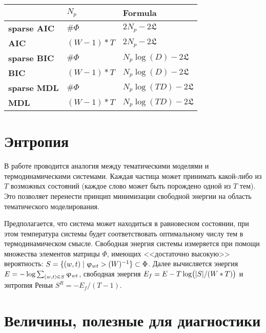\begin{table}[h]
    \centering
    \begin{tabular}{lll}
    \toprule
               & $N_p$       & Formula                                             \\
    \midrule
    \textbf{sparse AIC} & $\#\Phi$       & $2 N_p - 2 \mathfrak{L}$                \\
    \textbf{AIC}        & $(W - 1) * T$  & $2 N_p - 2 \mathfrak{L}$                \\
    \textbf{sparse BIC} & $\#\Phi$       & $N_p \log(D) - 2 \mathfrak{L}$          \\
    \textbf{BIC}        & $(W - 1) * T$  & $N_p \log(D) - 2 \mathfrak{L}$          \\
    \textbf{sparse MDL} & $\#\Phi$       & $N_p \log(TD) - 2 \mathfrak{L}$         \\
    \textbf{MDL}        & $(W - 1) * T$  & $N_p \log(TD) - 2 \mathfrak{L}$\\
    \bottomrule
    \end{tabular}
\end{table}

\section{Энтропия} 

В работе \cite{koltcov2018application} проводится аналогия между тематическими моделями и термодинамическими системами. Каждая частица может принимать какой-либо из $T$ возможных состояний (каждое слово может быть порождено одной из $T$ тем). Это позволяет перенести принцип минимизации свободной энергии на область тематического моделирования.

Предполагается, что система может находиться в равновесном состоянии, при этом температура системы будет соответствовать оптимальному числу тем в термодинамическом смысле. Свободная энергия системы измеряется при помощи множества элементов матрицы $\Phi$, имеющих <<достаточно высокую>> вероятность: $S \hm= \{(w, t) \hm\mid \phi_{wt} \hm> (W)^{-1} \} \hm\subset \Phi$. Далее вычисляется энергия $E \hm= -\log \sum_{(w,t) \in S} \phi_{wt}$, свободная энергия  $E_f \hm= E - T \log\bigl(|S| / (W * T)\bigr)$ и энтропия Реньи $S^R = -E_f / (T - 1)$.

\section{Величины, полезные для диагностики}

